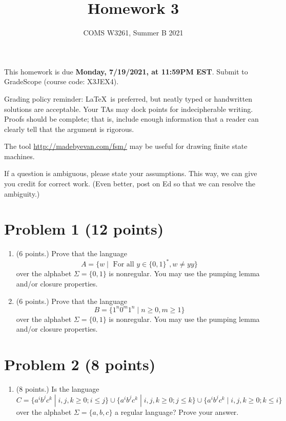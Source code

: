 \documentclass[letterpaper,11pt,twoside]{article}
\title{Homework 3}
\date{COMS W3261, Summer B 2021}
\theoremstyle{plain}
\theoremstyle{definition}
\theoremstyle{remark}
\theoremstyle{restate}
\begin{document}
\maketitle

This homework is due \textbf{Monday, 7/19/2021, at 11:59PM EST}. Submit to GradeScope (course code: X3JEX4).

Grading policy reminder: \LaTeX~is preferred, but neatly typed or handwritten solutions are acceptable. Your TAs may dock points for indecipherable writing. Proofs should be complete; that is, include enough information that a reader can clearly tell that the argument is rigorous.

The tool \url{http://madebyevan.com/fsm/} may be useful for drawing finite state machines.

If a question is ambiguous, please state your assumptions. This way, we can give you credit for correct work. (Even better, post on Ed so that we can resolve the ambiguity.)



\clearpage
\section{Problem 1 (12 points)}

\begin{enumerate}
    \item (6 points.) Prove that the language
    \[
        A = \{w \; | \; \text{ For all } y \in \{0, 1\}^*, w \neq yy\}
    \]
    over the alphabet $\Sigma = \{0,1\}$ is nonregular. You may use the pumping lemma and/or closure properties.
    
    \item (6 points.) Prove that the language
    \[
        B = \{1^n0^m1^n \; | \; n \geq 0, m \geq 1\}
    \]
    over the alphabet $\Sigma = \{0,1\}$ is nonregular. You may use the pumping lemma and/or closure properties.
\end{enumerate}

\clearpage
\section{Problem 2 (8 points)}
\begin{enumerate}
    \item (8 points.) Is the language
    \[
        C = \{a^ib^jc^k \; | \; i, j, k \geq 0; i \leq j\} \cup
        \{a^ib^jc^k \; | \; i, j, k \geq 0; j \leq k\} \cup
        \{a^ib^jc^k \; | \; i, j, k \geq 0; k \leq i\}
    \]
    over the alphabet $\Sigma = \{a, b, c\}$ a regular language? Prove your answer.
\end{enumerate}
\end{document}
